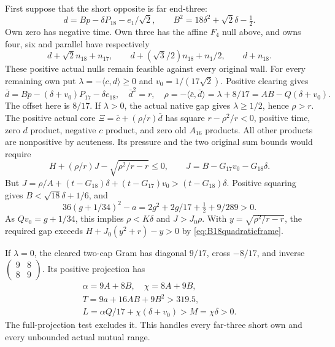 \documentclass[11pt]{article}
\theoremstyle{definition}
\theoremstyle{remark}
\newcommand{\ip}[2]{\langle #1,#2\rangle}
\begin{document}
First suppose that the short opposite is far end-three:
\[
 d=Bp-\delta P_{18}-e_1/\sqrt2,\qquad
 B^2=18\delta^2+\sqrt2\delta-\tfrac12 .
\]
Own zero has negative time. Own three has the affine \(F_4\)
null above, and owns four, six and parallel have respectively
\[
 d+\sqrt2n_{18}+n_{17},\qquad
 d+(\sqrt3/2)n_{18}+n_1/2,\qquad d+n_{18}.
\]
These positive actual nulls remain feasible against every original wall.
For every remaining own put \(\lambda=-\ip cd\geq0\) and
\(v_0=1/(17\sqrt2)\). Positive clearing gives
\[
 \bar d=Bp-(\delta+v_0)P_{17}-\delta e_{18},\quad
 \bar d^2=r,\quad
 \rho=-\ip{\bar c}{\bar d}=\lambda+8/17
       =AB-Q(\delta+v_0).
\]
The offset here is \(8/17\). If \(\lambda>0\), the actual native
gap gives \(\lambda\geq1/2\), hence \(\rho>r\).
The positive actual core \(\Xi=\bar c+(\rho/r)\bar d\)
has square \(r-\rho^2/r<0\), positive time, zero \(d\) product,
negative \(c\) product, and zero old \(A_{16}\) products.
All other products are nonpositive by acuteness.
Its pressure and the two original sum bounds would require
\[
 H+(\rho/r)J-\sqrt{\rho^2/r-r}\leq0,\qquad
 J=B-G_{17}v_0-G_{18}\delta .
\]
But \(J=\rho/A+(t-G_{18})\delta+(t-G_{17})v_0
>(t-G_{18})\delta\).
Positive squaring gives \(B<\sqrt{18}\delta+1/6\), and
\[
 36(g+1/34)^2-a
 =2g^2+2g/17+\tfrac12+9/289>0 .
\]
As \(Qv_0=g+1/34\), this implies \(\rho<K\delta\)
and \(J>J_0\rho\).
With \(y=\sqrt{\rho^2/r-r}\), the required gap exceeds
\(H+J_0(y^2+r)-y>0\) by \eqref{eq:B18quadraticframe}.

If \(\lambda=0\), the cleared two-cap Gram has diagonal \(9/17\),
cross \(-8/17\), and inverse
\(\left(\begin{smallmatrix}9&8\\8&9\end{smallmatrix}\right)\).
Its positive projection has
\[
\begin{gathered}
 \alpha=9A+8B,\quad \chi=8A+9B,\\
 T=9a+16AB+9B^2>319.5,\\
 L=\alpha Q/17+\chi(\delta+v_0)>M=\chi\delta>0 .
\end{gathered}
\]
The full-projection test excludes it. This handles every far-three
short own and every unbounded actual mutual range.
\end{document}
